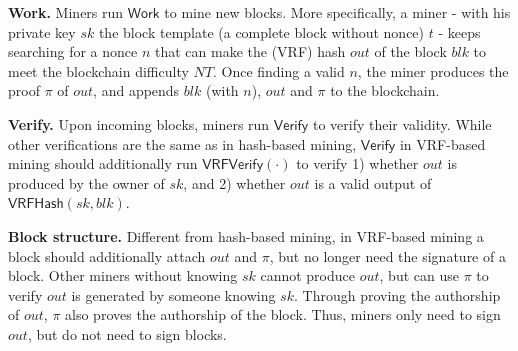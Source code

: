 \textbf{Work.}
Miners run $\mathsf{Work}$ to mine new blocks.
More specifically, a miner - with his private key $sk$ the block template (a complete block without nonce) $t$ - keeps searching for a nonce $n$ that can make the (VRF) hash $out$ of the block $blk$ to meet the blockchain difficulty $NT$.
Once finding a valid $n$, the miner produces the proof $\pi$ of $out$, and appends $blk$ (with $n$), $out$ and $\pi$ to the blockchain.

\textbf{Verify.}
Upon incoming blocks, miners run $\mathsf{Verify}$ to verify their validity.
While other verifications are the same as in hash-based mining, $\mathsf{Verify}$ in VRF-based mining should additionally run $\mathsf{VRFVerify}(\cdot)$ to verify 1) whether $out$ is produced by the owner of $sk$, and 2) whether $out$ is a valid output of $\mathsf{VRFHash}(sk, blk)$.

\textbf{Block structure.}
Different from hash-based mining, in VRF-based mining a block should additionally attach $out$ and $\pi$, but no longer need the signature of a block.
Other miners without knowing $sk$ cannot produce $out$, but can use $\pi$ to verify $out$ is generated by someone knowing $sk$.
Through proving the authorship of $out$, $\pi$ also proves the authorship of the block.
Thus, miners only need to sign $out$, but do not need to sign blocks.